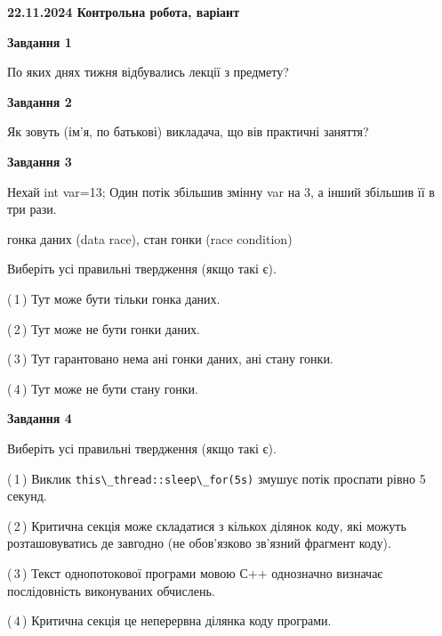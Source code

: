 \documentclass[12pt, ukrainian]{article}
\def\code#1{\Verb!#1!}
\begin{document}
\begin {large}

\textbf{22.11.2024 Контрольна робота, варіант  }\par


{

\begin{center}
\textbf{Завдання 1}
\end{center}

По яких днях тижня відбувались лекції з предмету?


\begin{center}
\textbf{Завдання 2}
\end{center}

Як зовуть (ім'я, по батькові) викладача, що вів практичні заняття?


\begin{center}
\textbf{Завдання 3}
\end{center}

Нехай int var=13; Один потік збільшив змінну var на 3, а інший збільшив її в три рази.

гонка даних (data race), стан гонки (race condition)

Виберіть усі правильні твердження (якщо такі є).\par
\vspace{2mm}
(\,1\,) Тут може бути тільки гонка даних.%

(\,2\,) Тут може не бути гонки даних.%

(\,3\,) Тут гарантовано нема ані гонки даних, ані стану гонки.%

(\,4\,) Тут може не бути стану гонки.%


\begin{center}
\textbf{Завдання 4}
\end{center}

Виберіть усі правильні твердження (якщо такі є).\par
\vspace{2mm}

(\,1\,) Виклик \code{this\_thread::sleep\_for(5s)} змушує потік проспати рівно 5 секунд.%

(\,2\,) Критична секція може складатися з кількох ділянок коду, які можуть розташовуватись де завгодно (не обов’язково зв’язний фрагмент коду).%

(\,3\,) Текст однопотокової програми мовою С++ однозначно визначає послідовність виконуваних обчислень.%

(\,4\,) Критична секція це неперервна ділянка коду програми.%


}
\end{large}
\end{document}
